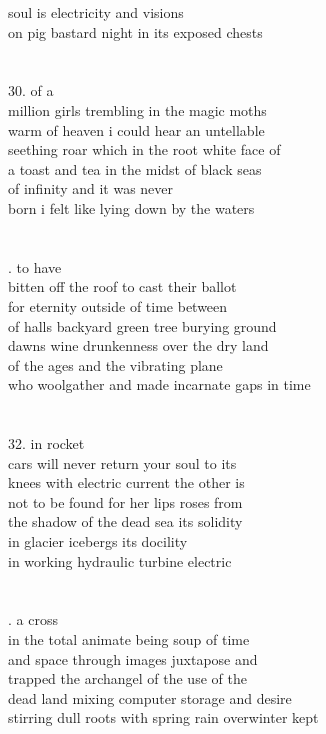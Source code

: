 \documentclass{article}
\begin{document}
soul is electricity and visions\\
on pig bastard night in its exposed chests\\
\\
\\
30. of a\\
million girls trembling in the magic moths\\
warm of heaven i could hear an untellable\\
seething roar which in the root white face of\\
a toast and tea in the midst of black seas\\
of infinity and it was never\\
born i felt like lying down by the waters\\
\\
\\
\newpage
{}. to have\\
bitten off the roof to cast their ballot\\
for eternity outside of time between\\
of halls backyard green tree burying ground\\
dawns wine drunkenness over the dry land\\
of the ages and the vibrating plane\\
who woolgather and made incarnate gaps in time\\
\\
\\
32. in rocket\\
cars will never return your soul to its\\
knees with electric current the other is\\
not to be found for her lips roses from\\
the shadow of the dead sea its solidity\\
in glacier icebergs its docility\\
in working hydraulic turbine electric\\
\\
\\
\newpage
{}. a cross\\
in the total animate being soup of time\\
and space through images juxtapose and\\
trapped the archangel of the use of the\\
dead land mixing computer storage and desire\\
stirring dull roots with spring rain overwinter kept\\
\end{document}
